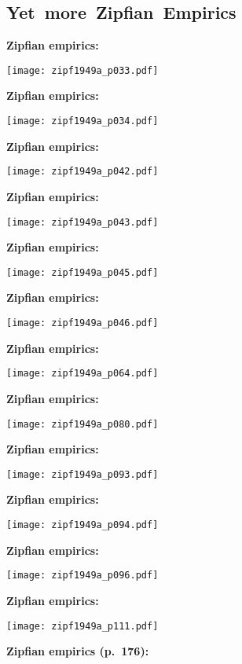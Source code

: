 \begin{frame}[plain]
\section{Yet\ more\ Zipfian\ Empirics}

  \textbf{Zipfian empirics:}

    \centering
  \texttt{[image: zipf1949a\_p033.pdf]}


  \textbf{Zipfian empirics:}

    \centering
  \texttt{[image: zipf1949a\_p034.pdf]}


  \textbf{Zipfian empirics:}

    \centering
  \texttt{[image: zipf1949a\_p042.pdf]}


  \textbf{Zipfian empirics:}

    \centering
  \texttt{[image: zipf1949a\_p043.pdf]}


  \textbf{Zipfian empirics:}

    \centering
  \texttt{[image: zipf1949a\_p045.pdf]}


  \textbf{Zipfian empirics:}

    \centering
  \texttt{[image: zipf1949a\_p046.pdf]}


  \textbf{Zipfian empirics:}

    \centering
  \texttt{[image: zipf1949a\_p064.pdf]}


  \textbf{Zipfian empirics:}

    \centering
  \texttt{[image: zipf1949a\_p080.pdf]}


  \textbf{Zipfian empirics:}

    \centering
  \texttt{[image: zipf1949a\_p093.pdf]}


  \textbf{Zipfian empirics:}

    \centering
  \texttt{[image: zipf1949a\_p094.pdf]}


  \textbf{Zipfian empirics:}

    \centering
  \texttt{[image: zipf1949a\_p096.pdf]}


  \textbf{Zipfian empirics:}

  \centering
  \texttt{[image: zipf1949a\_p111.pdf]}


  \textbf{Zipfian empirics (p.\ 176):}


\end{frame}
